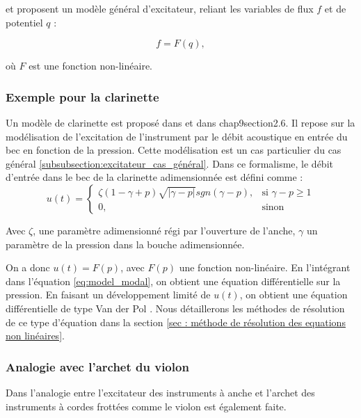 \documentclass[atiam, article]{rapport} %
\begin{document}
\cite{mcintyre_oscillations_1983} et \cite{maganza_bifurcations_1986} proposent un modèle général d'excitateur, reliant les variables de flux $f$ et de potentiel $q$ :

\begin{equation}
    f=F(q),
\end{equation}

où $F$ est une fonction non-linéaire.

\subsubsection{Exemple pour la clarinette}
Un modèle de clarinette est proposé dans \cite{missoum_explicit_2014} et dans \cite{chaigne2008acoustique} chap9section2.6. Il repose sur la modélisation de l'excitation de l'instrument par le débit acoustique en entrée du bec en fonction de la pression. Cette modélisation est un cas particulier du cas général \ref{subsubsection:excitateur_cas_général}. 
Dans ce formalisme, le débit d'entrée dans le bec de la clarinette adimensionnée est défini comme : \\

\begin{equation}
    u(t) = \begin{cases}
    \zeta(1-\gamma+p)\sqrt{|\gamma-p|}sgn(\gamma-p),& \text{si }\gamma-p\geq 1\\
    0,              & \text{sinon}
\end{cases}
\end{equation}

Avec $\zeta$, une paramètre adimensionné régi par l'ouverture de l'anche, $\gamma$ un paramètre de la pression dans la bouche adimensionnée. 

On a donc $u(t) = F(p)$, avec $F(p)$ une fonction non-linéaire. En l'intégrant dans l'équation \ref{eq:model_modal}, on obtient une équation différentielle sur la pression. En faisant un développement limité de $u(t)$, on obtient une équation différentielle de type Van der Pol \cite{chaigne2008acoustique}.  Nous détaillerons les méthodes de résolution de ce type d'équation dans la section \ref{sec : méthode de résolution des equations non linéaires}. 

\subsubsection{Analogie avec l'archet du violon}

Dans \cite{ollivier_idealized_2004} l'analogie entre l'excitateur des instruments à anche et l'archet des instruments à cordes frottées comme le violon est également faite. 
\end{document}
